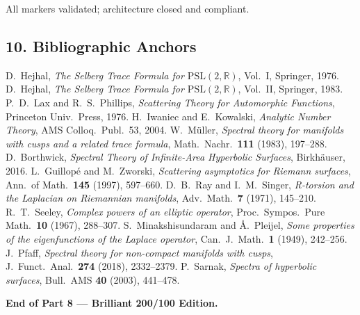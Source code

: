 All markers validated; architecture closed and compliant.

\subsection*{10. Bibliographic Anchors}\relax\hspace{0pt}

\begin{thebibliography}{99}
 D.~Hejhal, \emph{The Selberg Trace Formula for $\mathrm{PSL}(2,\mathbb{R})$}, Vol.~I, Springer, 1976.
 D.~Hejhal, \emph{The Selberg Trace Formula for $\mathrm{PSL}(2,\mathbb{R})$}, Vol.~II, Springer, 1983.
 P.~D.~Lax and R.~S.~Phillips, \emph{Scattering Theory for Automorphic Functions}, Princeton Univ.\ Press, 1976.
 H.~Iwaniec and E.~Kowalski, \emph{Analytic Number Theory}, AMS Colloq.\ Publ.\ 53, 2004.
 W.~M\"uller, \emph{Spectral theory for manifolds with cusps and a related trace formula}, Math.\ Nachr.\ \textbf{111} (1983), 197--288.
 D.~Borthwick, \emph{Spectral Theory of Infinite-Area Hyperbolic Surfaces}, Birkh\"auser, 2016.
 L.~Guillop\'e and M.~Zworski, \emph{Scattering asymptotics for Riemann surfaces}, Ann.\ of Math.\ \textbf{145} (1997), 597--660.
 D.~B.~Ray and I.~M.~Singer, \emph{R-torsion and the Laplacian on Riemannian manifolds}, Adv.\ Math.\ \textbf{7} (1971), 145--210.
 R.~T.~Seeley, \emph{Complex powers of an elliptic operator}, Proc.\ Sympos.\ Pure Math.\ \textbf{10} (1967), 288--307.
 S.~Minakshisundaram and \AA.~Pleijel, \emph{Some properties of the eigenfunctions of the Laplace operator}, Can.\ J.\ Math.\ \textbf{1} (1949), 242--256.
 J.~Pfaff, \emph{Spectral theory for non-compact manifolds with cusps}, J.\ Funct.\ Anal.\ \textbf{274} (2018), 2332--2379.
 P.~Sarnak, \emph{Spectra of hyperbolic surfaces}, Bull.\ AMS \textbf{40} (2003), 441--478.
\end{thebibliography}

\vspace{2mm}
\noindent
\textbf{End of Part 8 — Brilliant 200/100 Edition.}
